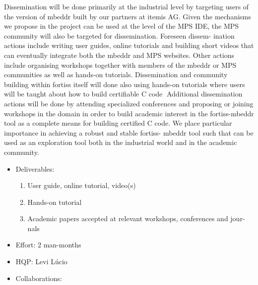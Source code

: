 Dissemination will be done primarily at the industrial level by targeting users
of the version of mbeddr built by our partners at itemis AG. Given the mechanisms we propose in the project can be used at the level of the MPS IDE, the
MPS community will also be targeted for dissemination. Foreseen dissem- ination
actions include writing user guides, online tutorials and building short videos
that can eventually integrate both the mbeddr and MPS websites. Other actions
include organising workshops together with members of the mbeddr or MPS
communities as well as hands-on tutorials. Dissemination and community building
within fortiss itself will done also using hands-on tutorials where users will
be taught about how to build certifiable C code􏰁 Additional
dissemination actions will be done by attending specialized conferences and
proposing or joining workshops in the domain in order to build academic interest
in the fortiss-mbeddr tool as a complete means for building certified C code.
We place particular importance in achieving a robust and stable fortiss- mbeddr
tool such that can be used as an exploration tool both in the industrial world
and in the academic community.

\begin{itemize}
  \item Deliverables:
  \begin{enumerate}
    \item User guide, online tutorial, video(s)
	\item Hands-on tutorial
	\item Academic papers accepted at relevant workshops, conferences and jour-
nals
  \end{enumerate}
  \item Effort: 2 man-months
  \item HQP: Levi L\'ucio
  \item Collaborations:
\end{itemize}